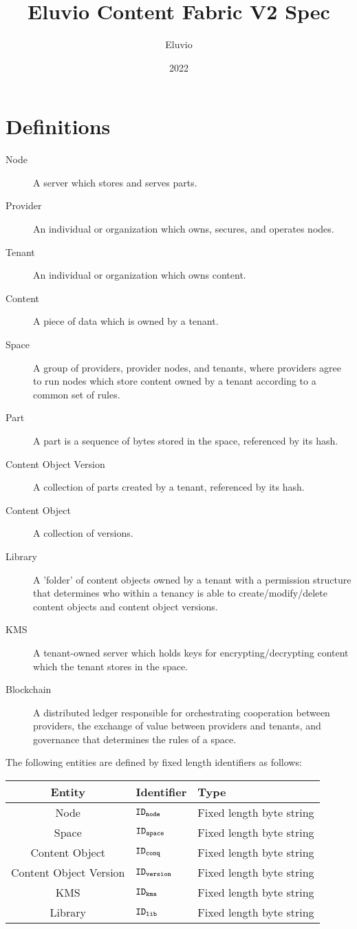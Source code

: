 \documentclass{article}
\title{Eluvio Content Fabric V2 Spec}
\author{Eluvio}
\date{2022}
\begin{document}
\maketitle



\setcounter{section}{-1}
\section{Definitions}
\begin{description}
  \item[Node] A server which stores and serves parts.
  \item[Provider] An individual or organization which owns, secures, and operates nodes.
  \item[Tenant] An individual or organization which owns content.
  \item[Content] A piece of data which is owned by a tenant.
  \item[Space] A group of providers, provider nodes, and tenants, where providers agree to run nodes which store content owned by a tenant according to a common set of rules.
  \item[Part] A part is a sequence of bytes stored in the space, referenced by its hash. 
  \item[Content Object Version] A collection of parts created by a tenant, referenced by its hash.
  \item[Content Object] A collection of versions.
  \item[Library] A 'folder' of content objects owned by a tenant with a permission structure that determines who within a tenancy is able to create/modify/delete content objects and content object versions.
  \item[KMS] A tenant-owned server which holds keys for encrypting/decrypting content which the tenant stores in the space.
  \item[Blockchain] A distributed ledger responsible for orchestrating cooperation between providers, the exchange of value between providers and tenants, and governance that determines the rules of a space.
\end{description}

The following entities are defined by fixed length identifiers as follows:
\begin{center}
  \begin{tabular}{| c | l | l |}
    \hline
    Entity & Identifier & Type \\
    \hline 
    Node & $\mathtt{ID_{node}}$ & Fixed length byte string \\
    Space & $\mathtt{ID_{space}}$ & Fixed length byte string \\
    Content Object & $\mathtt{ID_{conq}}$ & Fixed length byte string \\
    Content Object Version & $\mathtt{ID_{version}}$ & Fixed length byte string \\
    KMS & $\mathtt{ID_{kms}}$ & Fixed length byte string \\
    Library & $\mathtt{ID_{lib}}$ & Fixed length byte string \\
    \hline 
  \end{tabular}
\end{center}
\end{document}
